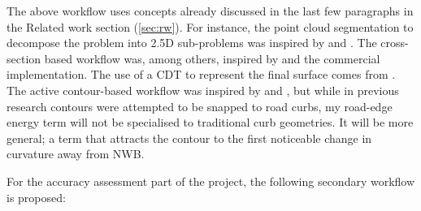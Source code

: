 The above workflow uses concepts already discussed in the last few paragraphs in the Related work section (\ref{sec:rw}). For instance, the point cloud segmentation to decompose the problem into 2.5D sub-problems was inspired by \cite{oudeElberink_vosselman_2009} and \cite{boyko_funkhauser_2011}. The cross-section based workflow was, among others, inspired by \cite{yang_etal_2013} and the commercial implementation. The use of a CDT to represent the final surface comes from \cite{oudeElberink_vosselman_2006}. The active contour-based workflow was inspired by \cite{boyko_funkhauser_2011} and \cite{gopfert_etal_2011}, but while in previous research contours were attempted to be snapped to road curbs, my road-edge energy term will not be specialised to traditional curb geometries. It will be more general; a term that attracts the contour to the first noticeable change in curvature away from NWB.

For the accuracy assessment part of the project, the following secondary workflow is proposed:

